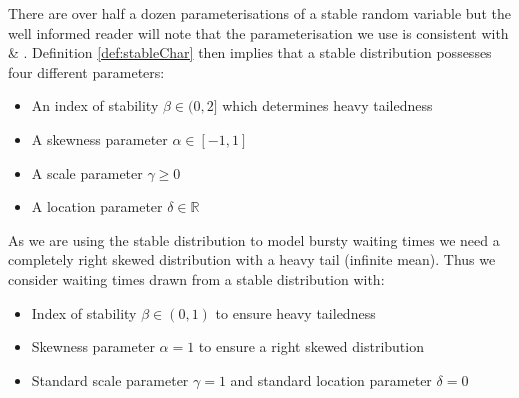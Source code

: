 \documentclass[honours,12pt]{UNSWthesis}
\newcommand{\R}{\mathbb{R}}
\newcommand{\1}{\mathbf 1}
\numberwithin{equation}{section}
\theoremstyle{definition}
\theoremstyle{remark}
\begin{document}
\noindent There are over half a dozen parameterisations of a stable random variable but the well informed reader will note that the parameterisation we use is consistent with \cite{MeerschaertStoev08} \& \cite{Samorodnitsky}. Definition \ref{def:stableChar} then implies that a stable distribution possesses four different parameters:
\begin{itemize}
	\item An index of stability $\beta \in (0,2]$ which determines heavy tailedness 
	\item A skewness parameter $\alpha \in [-1,1]$
	\item A scale parameter $\gamma\geq0$
	\item A location parameter $\delta \in \R$\\
\end{itemize}

\noindent As we are using the stable distribution to model bursty waiting times we need a completely right skewed distribution with a heavy tail (infinite mean). Thus we consider waiting times drawn from a stable distribution with:
\begin{itemize}
	\item Index of stability $\beta \in (0,1)$ to ensure heavy tailedness
	\item Skewness parameter $\alpha=1$ to ensure a right skewed distribution
	\item Standard scale parameter $\gamma=1$ and standard location parameter $\delta=0$\\
\end{itemize}
\end{document}
